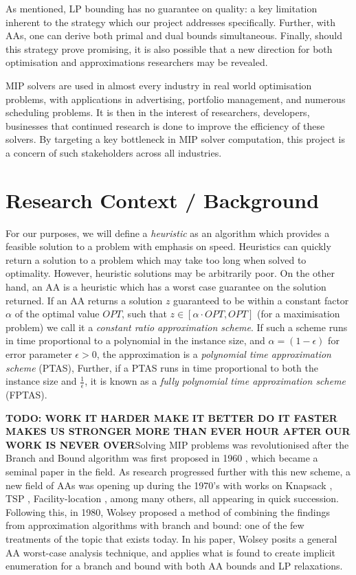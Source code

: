 \documentclass[12pt, a4paper]{article}
\begin{document}
As mentioned, LP bounding has no guarantee on quality: a key limitation inherent to the strategy which our project addresses specifically. Further, with AAs, one can derive both primal and dual bounds simultaneous. Finally, should this strategy prove promising, it is also possible that a new direction for both optimisation and approximations researchers may be revealed. 

MIP solvers are used in almost every industry in real world optimisation problems, with applications in advertising, portfolio management, and numerous scheduling problems. It is then in the interest of researchers, developers, businesses that continued research is done to improve the efficiency of these solvers. By targeting a key bottleneck in MIP solver computation, this project is a concern of such stakeholders across all industries. 

\section{Research Context / Background}

For our purposes, we will define a \textit{heuristic} as an algorithm which provides a feasible solution to a problem with emphasis on speed. Heuristics can quickly return a solution to a problem which may take too long when solved to optimality. However, heuristic solutions may be arbitrarily poor. On the other hand, an AA is a heuristic which has a worst case guarantee on the solution returned. If an AA returns a solution $z$ guaranteed to be within a constant factor $\alpha$ of the optimal value $OPT$, such that $z \in [\alpha \cdot OPT, OPT]$ (for a maximisation problem) we call it a \emph{constant ratio approximation scheme}. If such a scheme runs in time proportional to a polynomial in the instance size, and $\alpha = (1-\epsilon)$ for error parameter $\epsilon > 0$, the approximation is a \emph{polynomial time approximation scheme} (PTAS), Further, if a PTAS runs in time proportional to both the instance size and $\frac{1}{\epsilon}$, it is known as a \emph{fully polynomial time approximation scheme} (FPTAS).

\textbf{TODO: WORK IT HARDER MAKE IT BETTER DO IT FASTER MAKES US STRONGER MORE THAN EVER HOUR AFTER OUR WORK IS NEVER OVER}Solving MIP problems was revolutionised after the Branch and Bound algorithm was first proposed in 1960 \cite{LandDoig}, which became a seminal paper in the field. As research progressed further with this new scheme, a new field of AAs was opening up during the 1970's with works on Knapsack \cite{IbarraKim}, TSP \cite{CristofidesTSP}, Facility-location \cite{CornuejolsFisherNemhauser}, among many others, all appearing in quick succession. Following this, in 1980, Wolsey \cite{WOLSEY} proposed a method of combining the findings from approximation algorithms with branch and bound: one of the few treatments of the topic that exists today. In his paper, Wolsey posits a general AA worst-case analysis technique, and applies what is found to create implicit enumeration for a branch and bound with both AA bounds and LP relaxations. 
\end{document}
